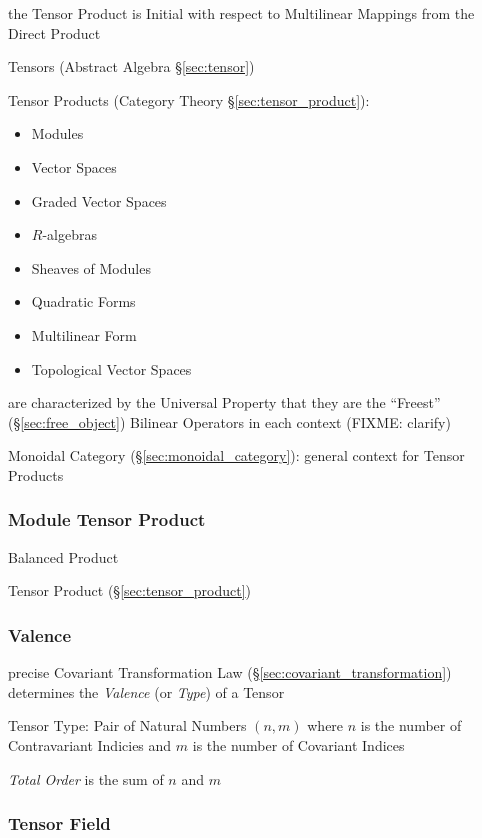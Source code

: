 the Tensor Product is Initial with respect to Multilinear Mappings
from the Direct Product

Tensors (Abstract Algebra \S\ref{sec:tensor})

Tensor Products (Category Theory \S\ref{sec:tensor_product}):
\begin{itemize}
  \item Modules
  \item Vector Spaces
  \item Graded Vector Spaces
  \item $R$-algebras
  \item Sheaves of Modules
  \item Quadratic Forms
  \item Multilinear Form
  \item Topological Vector Spaces
\end{itemize}
are characterized by the Universal Property that they are the ``Freest''
(\S\ref{sec:free_object}) Bilinear Operators in each context
(FIXME: clarify)

Monoidal Category (\S\ref{sec:monoidal_category}): general context for
Tensor Products



\subsubsection{Module Tensor Product}\label{sec:module_tensor_product}

Balanced Product

\fist Tensor Product (\S\ref{sec:tensor_product})



\subsubsection{Valence}\label{sec:valence}

precise Covariant Transformation Law
(\S\ref{sec:covariant_transformation}) determines the \emph{Valence}
(or \emph{Type}) of a Tensor

Tensor Type: Pair of Natural Numbers $(n,m)$ where $n$ is the number
of Contravariant Indicies and $m$ is the number of Covariant Indices

\emph{Total Order} is the sum of $n$ and $m$



\subsubsection{Tensor Field}\label{sec:tensor_field}

